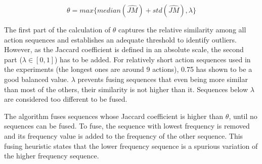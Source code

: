 \begin{equation}
 \theta = max \{ median(\hat{JM}) + std(\hat{JM}), \lambda \}
\end{equation}

The first part of the calculation of $\theta$ captures the relative similarity among all action sequences and establishes an adequate threshold to identify outliers. However, as the Jaccard coefficient is defined in an absolute scale, the second part ($\lambda \in [0, 1]$) has to be added. For relatively short action sequences used in the experiments (the longest ones are around 9 actions), 0.75 has shown to be a good balanced value. $\lambda$ prevents fusing sequences that even being more similar than most of the others, their similarity is not higher than it. Sequences below $\lambda$ are considered too different to be fused. 

The algorithm fuses sequences whose Jaccard coefficient is higher than $\theta$, until no sequences can be fused. To fuse, the sequence with lowest frequency is removed and its frequency value is added to the frequency of the other sequence. This fusing heuristic states that the lower frequency sequence is a spurious variation of the higher frequency sequence. 